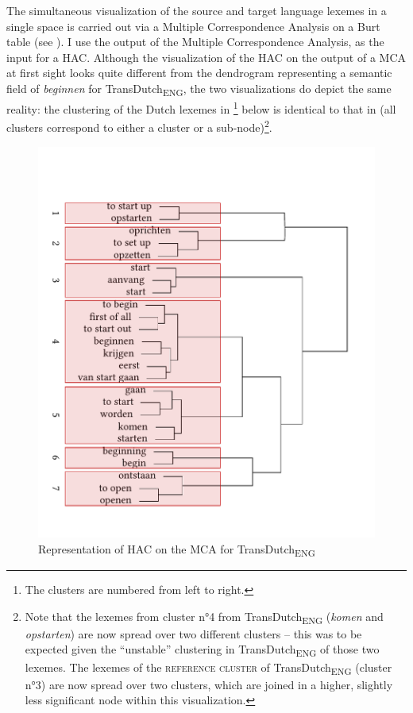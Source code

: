 The simultaneous visualization of the source and target language lexemes in a single space is carried out via a Multiple Correspondence Analysis on a Burt table \citep{greenacre_simple_2006, greenacre_correspondence_2007} (see ). I use the output of the Multiple Correspondence Analysis, as the input for a HAC. Although the visualization of the HAC on the output of a MCA at first sight looks quite different from the dendrogram representing a semantic field of \textit{beginnen} for TransDutch\textsubscript{ENG}, the two visualizations do depict the same reality: the clustering of the Dutch lexemes in \footnote{The clusters are numbered from left to right.} below is identical to that in  (all clusters correspond to either a cluster or a sub-node)\footnote{Note that the lexemes from cluster n°4 from TransDutch\textsubscript{ENG} (\textit{komen} and \textit{opstarten}) are now spread over two different clusters – this was to be expected given the ``unstable'' clustering in TransDutch\textsubscript{ENG} of those two lexemes. The lexemes of the \textsc{reference cluster} of TransDutch\textsubscript{ENG} (cluster n°3) are now spread over two clusters, which are joined in a higher, slightly less significant node within this visualization.}.

\begin{figure}
\includegraphics[width=\textwidth]{figures/tree92.pdf}
\caption{\label{fig:4:89}  Representation of HAC on the MCA for TransDutch\textsubscript{ENG}}
\end{figure}

